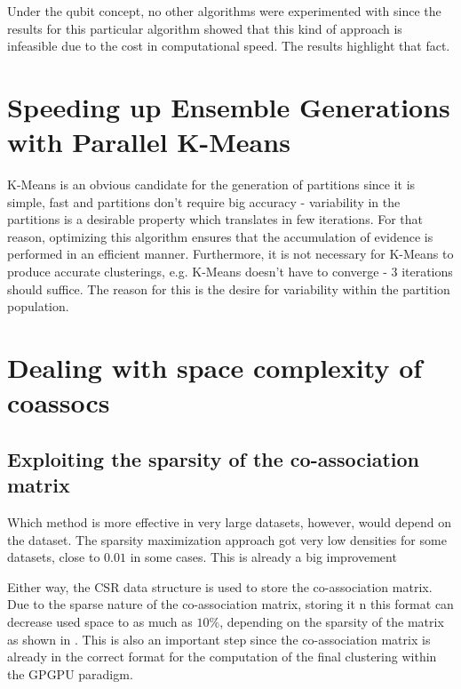 Under the qubit concept, no other algorithms were experimented with since the results for this particular algorithm showed that this kind of approach is infeasible due to the cost in computational speed. The results highlight that fact.



\section{Speeding up Ensemble Generations with Parallel K-Means}
K-Means is an obvious candidate for the generation of partitions since it is simple, fast and partitions don't require big accuracy - variability in the partitions is a desirable property which translates in few iterations. For that reason, optimizing this algorithm ensures that the accumulation of evidence is performed in an efficient manner.
Furthermore, it is not necessary for K-Means to produce accurate clusterings, e.g. K-Means doesn't have to converge - 3 iterations should suffice. The reason for this is the desire for variability within the partition population.



\section{Dealing with space complexity of coassocs}

\subsection{Exploiting the sparsity of the co-association matrix}



Which method is more effective in very large datasets, however, would depend on the dataset. The sparsity maximization approach got very low densities for some datasets, close to $0.01$ in some cases. This is already a big improvement

Either way, the CSR data structure is used to store the co-association matrix. 
Due to the sparse nature of the co-association matrix, storing it n this format can decrease used space to as much as $10\%$, depending on the sparsity of the matrix as shown in \cite{Lourenco2010}. 
This is also an important step since the co-association matrix is already in the correct format for the computation of the final clustering within the GPGPU paradigm.


